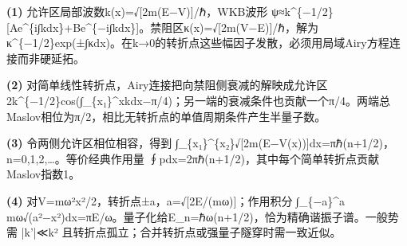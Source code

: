 \par\noindent\textbf{(1)} 允许区局部波数k(x)=√[2m(E−V)]/ℏ，WKB波形 ψ≈k\textasciicircum{}\{−1/2\}[Ae\textasciicircum{}\{i∫kdx\}+Be\textasciicircum{}\{−i∫kdx\}]。禁阻区κ(x)=√[2m(V−E)]/ℏ，解为κ\textasciicircum{}\{−1/2\}exp(±∫κdx)。在k→0的转折点这些幅因子发散，必须用局域Airy方程连接而非硬延拓。
\par\noindent\textbf{(2)} 对简单线性转折点，Airy连接把向禁阻侧衰减的解映成允许区 2k\textasciicircum{}\{−1/2\}cos(∫\_\{x₁\}\textasciicircum{}xkdx−π/4)；另一端的衰减条件也贡献一个π/4。两端总Maslov相位为π/2，相比无转折点的单值周期条件产生半量子数。
\par\noindent\textbf{(3)} 令两侧允许区相位相容，得到 ∫\_\{x₁\}\textasciicircum{}\{x₂\}√[2m(E−V(x))]dx=πℏ(n+1/2)，n=0,1,2,…。等价经典作用量 ∮pdx=2πℏ(n+1/2)，其中每个简单转折点贡献Maslov指数1。
\par\noindent\textbf{(4)} 对V=mω²x²/2，转折点±a，a=√[2E/(mω)]；作用积分 ∫\_\{−a\}\textasciicircum{}a mω√(a²−x²)dx=πE/ω。量子化给E\_n=ℏω(n+1/2)，恰为精确谐振子谱。一般势需 |k'|≪k² 且转折点孤立；合并转折点或强量子隧穿时需一致近似。
